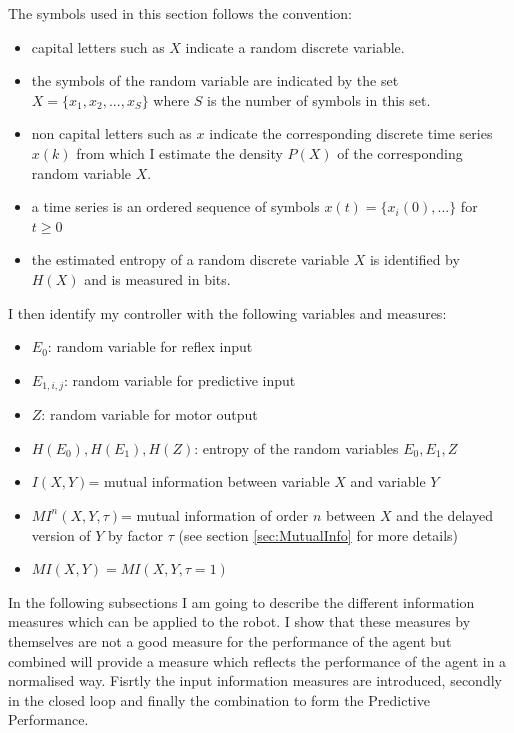 The symbols used in this section follows the convention:
\begin{itemize}
\item capital letters such as $X$ indicate a random discrete variable.
\item the symbols of the random variable are indicated by the set
  $X=\{x_1,x_2,...,x_S\}$ where $S$ is the number of symbols in this
set.
\item non capital letters such as $x$ indicate the corresponding
  discrete time series $x(k)$ from which I estimate the density
  $P(X)$ of the corresponding random variable $X$.
\item a time series is an ordered sequence of symbols
  $x(t)=\{x_i(0),... \}$ for $t \geq 0$
\item the estimated entropy of a random discrete variable $X$ is
  identified by $H(X)$ and is measured in bits.
\end{itemize}
I then identify my controller with the following variables and
measures:
\begin{itemize}
 \item $E_{0}$: random variable for reflex input
 \item $E_{1,i,j}$: random variable for predictive input
 \item $Z$: random variable for motor output
 \item $H( E_{0} ),H(E_{1}),H(Z)$: entropy of the random variables $E_0,E_1,Z$
 \item $I(X,Y)$= mutual information between variable $X$ and variable $Y$
 \item $MI^n(X,Y,\tau)$= mutual information of order $n$ between $X$ and 
	the delayed version of $Y$ by factor $\tau$ (see section \ref{sec:MutualInfo} for more details)
 \item $MI(X,Y)=MI(X,Y,\tau=1)$ 
\end{itemize}

In the following subsections I am going to describe the different information measures
 which can be applied to the robot.
I show that these measures by themselves are not a good measure for the performance of 
the agent but combined will provide a measure which reflects the performance of the 
agent in a normalised way.
Fisrtly the input information measures are introduced, secondly in the closed loop
 and finally the combination to form the Predictive Performance.

